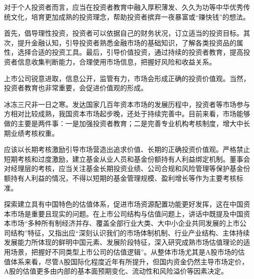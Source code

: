 \documentclass{ctexart}
\begin{document}
对于个人投资者而言，应当在投资者教育中融入厚积薄发、久久为功等中华优秀传统文化，培育更加成熟的投资理念，帮助投资者摈弃一夜暴富或“赚快钱”的想法。

首先，倡导理性投资，投资者可以依据自己的财务状况，订立适当的投资目标。其次，提升金融认知，引导投资者熟悉金融市场的基础知识，了解各类投资品的属性，选择合适的投资工具。最后，引导价值投资，通过持续的投资者教育，提高投资者信息收集判断能力，合理使用市场信息，把握好风险和收益关系。

上市公司锐意进取，信息公开，监管有力，市场会形成正确的投资价值观。当然，投资者教育也非常重要，会促进价值观的形成。

冰冻三尺非一日之寒。发达国家几百年资本市场的发展历程中，投资者等市场参与方相对比较成熟，我国资本市场起步晚，还处于持续完善中。目前来看，市场能够做的主要是两件事：一是加强投资者教育；二是完善专业机构考核制度，增大中长期业绩考核权重。

应该以长期考核激励引导市场营造出追求价值、长期的正确投资价值观。严格禁止短期考核和过度激励，建立基金从业人员和基金份额持有人利益绑定机制。董事会对经理层的考核，应当关注基金长期投资业绩、公司合规和风险管理等保护基金份额持有人利益的情况，不得以短期的基金管理规模、盈利增长等作为主要考核标准。

探索建立具有中国特色的估值体系，促进市场资源配置功能更好发挥，这在中国资本市场是重要且现实的问题。在上市公司结构与估值问题上，讲话中既提及中国资本市场“多种所有制经济并存、覆盖全部行业大类、大中小企业共同发展的上市公司结构”特征，又指出应“深刻认识我们的市场体制机制、行业产业结构、主体持续发展能力所体现的鲜明中国元素、发展阶段特征，深入研究成熟市场估值理论的适用场景，把握好不同类型上市公司的估值逻辑”。从整体市场尤其是A股市场的估值体系来看，尽管A股国际化程度近年有所提升，但国内资金仍然主导市场定价，A股的估值更多由内部的基本面预期变化、流动性和风险溢价等因素决定。
\end{document}
